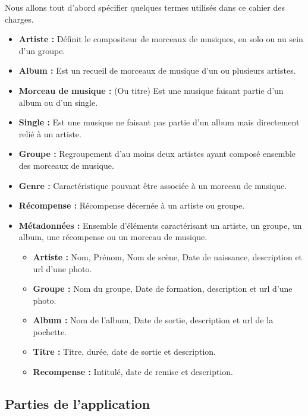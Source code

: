     \begin{paragraphe}
        Nous allons tout d'abord spécifier quelques termes utilisés dans ce cahier des charges.
        \begin{itemize}
            \item \textbf{Artiste :} Définit le compositeur de morceaux de musiques, en solo ou au sein d'un groupe.
            \item \textbf{Album :} Est un recueil de morceaux de musique d'un ou plusieurs artistes.
            \item \textbf{Morceau de musique :} (Ou titre) Est une musique faisant partie d'un album ou d'un single.
            \item \textbf{Single :} Est une musique ne faisant pas partie d'un album mais directement relié à un artiste.
            \item \textbf{Groupe :} Regroupement d'au moins deux artistes ayant composé ensemble des morceaux de musique.
            \item \textbf{Genre :} Caractéristique pouvant être associée à un morceau de musique.
            \item \textbf{Récompense :} Récompense décernée à un artiste ou groupe.
            \item \textbf{Métadonnées :} Ensemble d'éléments caractérisant un artiste, un groupe, un album, une récompense ou un morceau de musique.
            \begin{itemize}
                \item \textbf{Artiste :} Nom, Prénom, Nom de scène, Date de naissance, description et url d'une photo.
                \item \textbf{Groupe :} Nom du groupe, Date de formation, description et url d'une photo.
                \item \textbf{Album :} Nom de l'album, Date de sortie, description et url de la pochette.
                \item \textbf{Titre :} Titre, durée, date de sortie et description.
                \item \textbf{Recompense :} Intitulé, date de remise et description.
            \end{itemize}
        \end{itemize}
    \end{paragraphe}

    \subsection{Parties de l'application}

